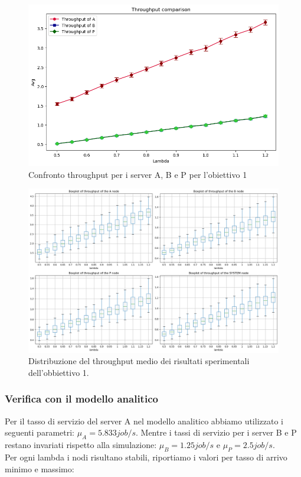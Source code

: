 \begin{figure}[H]
    \centering
    \includegraphics[width=\columnwidth]{figs/results/obj1/obj1-throughput-comparison.png}
    \caption{Confronto throughput per i server A, B e P per l'obiettivo 1}
    \label{fig:obj1_throughput_comparison}
\end{figure}

\begin{figure}
    \centering
    \includegraphics[width=\textwidth]{figs//results/obj1/obj1-box-throughput.png}
    \caption{Distribuzione del throughput medio dei risultati sperimentali dell'obbiettivo 1.}
    \label{fig:obj1_boxplot_throughput}
\end{figure}


\subsubsection{Verifica con il modello analitico}
Per il tasso di servizio del server A nel modello analitico abbiamo utilizzato i seguenti parametri:
$\displaystyle {\mu}_{A} = 5.833 job/s$.
Mentre i tassi di servizio per i server B e P restano invariati rispetto alla simulazione: $\displaystyle {\mu}_{B} = 1.25job/s$ e $\displaystyle {\mu}_{P} = 2.5job/s$.\\
Per ogni lambda i nodi risultano stabili, riportiamo i valori per tasso di arrivo minimo e massimo:

